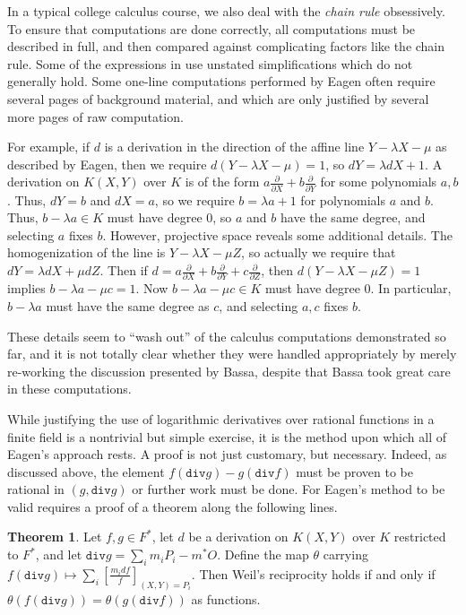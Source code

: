 \documentclass{article}
\theoremstyle{definition}
\newtheorem{theorem}{Theorem}
\newcommand{\6}{\mathbf}
\newcommand{\7}{\mathcal}
\begin{document}
In a typical college calculus course, we also deal with the \textit{chain rule} obsessively. To ensure that computations are done correctly, all computations must be described in full, and then compared against complicating factors like the chain rule. Some of the expressions in \cite{Eagen22} use unstated simplifications which do not generally hold. Some one-line computations performed by Eagen often require several pages of background material, and which are only justified by several more pages of raw computation. 

For example, if $d$ is a derivation in the direction of the affine line $Y - \lambda X - \mu$ as described by Eagen, then we require $d(Y - \lambda X - \mu) = 1$, so $dY = \lambda dX + 1$. A derivation on $K(X,Y)$ over $K$ is of the form $a \frac{\partial}{\partial X} + b\frac{\partial}{\partial Y}$ for some polynomials $a, b$. Thus, $dY = b$ and $dX = a$, so we require $b = \lambda a + 1$ for polynomials $a$ and $b$. Thus, $b - \lambda a \in K$ must have degree $0$, so $a$ and $b$ have the same degree, and selecting $a$ fixes $b$.
However, projective space reveals some additional details. The homogenization of the line is $Y - \lambda X - \mu Z$, so actually we require that $dY = \lambda dX + \mu dZ$. Then if $d = a \frac{\partial}{\partial X} + b\frac{\partial}{\partial Y} + c \frac{\partial}{\partial Z}$, then $d(Y - \lambda X - \mu Z) = 1$ implies $b - \lambda a - \mu c = 1$. Now $b - \lambda a - \mu c \in K$ must have degree $0$. In particular, $b - \lambda a$ must have the same degree as $c$, and selecting $a, c$ fixes $b$. 

These details seem to ``wash out'' of the calculus computations demonstrated so far, and it is not totally clear whether they were handled appropriately by merely re-working the discussion presented by Bassa, despite that Bassa took great care in these computations.




While justifying the use of logarithmic derivatives over rational functions in a finite field is a nontrivial but simple exercise, it is the method upon which all of Eagen's approach rests. A proof is not just customary, but necessary.
Indeed, as discussed above, the element $f(\texttt{div}g)-g(\texttt{div}f)$ must be proven to be rational in $(g, \texttt{div}g)$ or further work must be done.
For Eagen's method to be valid requires a proof of a theorem along the following lines.
\begin{theorem}
Let $f, g \in F^*$, let $d$ be a derivation on $K(X,Y)$ over $K$ restricted to $F^*$, and let $\texttt{div}g=\sum_i m_i P_i - m^* O$. Define the map $\theta$ carrying $f(\texttt{div}g) \mapsto \sum_i \left[\frac{m_i df}{f}\right]_{(X,Y)=P_i}$. Then Weil's reciprocity holds if and only if $\theta(f(\texttt{div}g))=\theta(g(\texttt{div}f))$ as functions.
\end{theorem}
\end{document}
